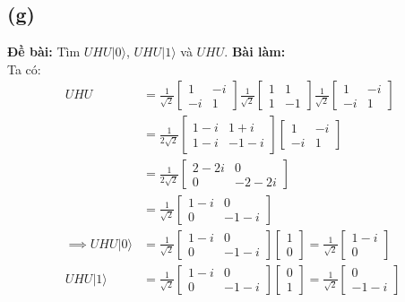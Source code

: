 \subsection{(g)}
\textbf{Đề bài:} Tìm $UHU|0\rangle$, $UHU|1\rangle$ và $UHU$.
\textbf{Bài làm:}\\
Ta có:
\begin{align*}
    UHU &= \frac{1}{\sqrt{2}}\begin{bmatrix}
        1 & -i\\
        -i & 1
    \end{bmatrix}
    \frac{1}{\sqrt{2}}\begin{bmatrix}
        1 & 1\\
        1 & -1
    \end{bmatrix}
    \frac{1}{\sqrt{2}}\begin{bmatrix}
        1 & -i\\
        -i & 1
    \end{bmatrix}\\
    &= \frac{1}{2\sqrt{2}}\begin{bmatrix}
        1 - i & 1 + i\\
        1 - i & - 1 - i
    \end{bmatrix}
    \begin{bmatrix}
        1 & -i\\
        -i & 1
    \end{bmatrix}\\
    &= \frac{1}{2\sqrt{2}}\begin{bmatrix}
        2 - 2i & 0\\
        0 & -2 - 2i
    \end{bmatrix} \\
    &= \frac{1}{\sqrt{2}}\begin{bmatrix}
        1 - i & 0\\
        0 & -1 - i
    \end{bmatrix}\\
    \implies UHU|0\rangle &= \frac{1}{\sqrt{2}}\begin{bmatrix}
        1 - i & 0\\
        0 & -1 - i
    \end{bmatrix}
    \begin{bmatrix}
        1\\
        0
    \end{bmatrix}
    = \frac{1}{\sqrt{2}}\begin{bmatrix}
        1 - i\\
        0
    \end{bmatrix}\\
    UHU|1\rangle &= \frac{1}{\sqrt{2}}
    \begin{bmatrix}
        1 - i & 0\\
        0 & -1 - i
    \end{bmatrix}
    \begin{bmatrix}
        0\\
        1
    \end{bmatrix}
    = \frac{1}{\sqrt{2}}\begin{bmatrix}
        0\\
        -1 - i
    \end{bmatrix}
\end{align*}

